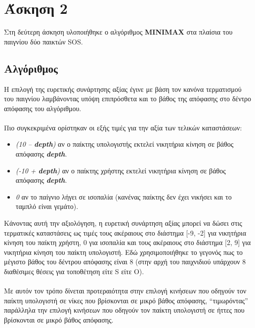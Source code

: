 \documentclass{article}
\begin{document}
\section*{Άσκηση 2}
Στη δεύτερη άσκηση υλοποιήθηκε ο αλγόριθμος \textbf{MINIMAX} στα πλαίσια του παιγνίου δύο παικτών SOS.
\subsection*{Αλγόριθμος}
Η επιλογή της ευρετικής συνάρτησης αξίας έγινε με βάση τον κανόνα τερματισμού του παιγνίου λαμβάνοντας υπόψη επιπρόσθετα και το βάθος της απόφασης στο δέντρο απόφασης του αλγόριθμου.\\\\
Πιο συγκεκριμένα ορίστηκαν οι εξής τιμές για την αξία των τελικών καταστάσεων:
\begin{itemize}
    \item \textit{(10 – \textbf{depth})} αν ο παίκτης υπολογιστής εκτελεί νικητήρια κίνηση σε βάθος απόφασης \textit{\textbf{depth}}.
    \item \textit{(-10 + \textbf{depth})} αν ο παίκτης χρήστης εκτελεί νικητήρια κίνηση σε βάθος απόφασης \textit{\textbf{depth}}.
    \item \textit{0} αν το παίγνιο λήγει σε ισοπαλία (κανένας παίκτης δεν έχει νικήσει και το ταμπλό είναι γεμάτο).
\end{itemize}
Κάνοντας αυτή την αξιολόγηση, η ευρετική συνάρτηση αξίας μπορεί να δώσει στις τερματικές καταστάσεις ως τιμές τους ακέραιους στο διάστημα
[-9, -2] για νικητήρια κίνηση του παίκτη χρήστη, 0 για ισοπαλία και τους ακέραιους στο διάστημα [2, 9] για
νικητήρια κίνηση του παίκτη υπολογιστή. Εδώ χρησιμοποιήθηκε το γεγονός πως το μέγιστο βάθος του δέντρου
απόφασης είναι 8 (στην αρχή του παιχνιδιού υπάρχουν 8 διαθέσιμες θέσεις
για τοποθέτηση είτε S είτε O).\\\\
Με αυτόν τον τρόπο δίνεται προτεραιότητα στην επιλογή κινήσεων που οδηγούν τον παίκτη υπολογιστή σε νίκες που βρίσκονται σε μικρό βάθος απόφασης, “τιμωρόντας” παράλληλα την επιλογή
κινήσεων που οδηγούν τον παίκτη υπολογιστή σε ήττες που βρίσκονται σε μικρό βάθος απόφασης.
\end{document}
